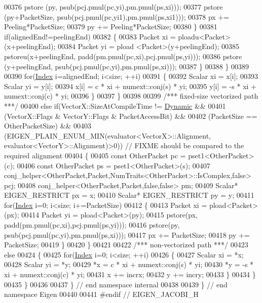 \begin{DoxyCode}
00376         pstore (py, psub(pcj.pmul(pc,yi),pm.pmul(ps,xi)));
00377         pstore (py+PacketSize, psub(pcj.pmul(pc,yi1),pm.pmul(ps,xi1)));
00378         px += Peeling*PacketSize;
00379         py += Peeling*PacketSize;
00380       \}
00381       \textcolor{keywordflow}{if}(alignedEnd!=peelingEnd)
00382       \{
00383         Packet xi = ploadu<Packet>(x+peelingEnd);
00384         Packet yi = pload <Packet>(y+peelingEnd);
00385         pstoreu(x+peelingEnd, padd(pm.pmul(pc,xi),pcj.pmul(ps,yi)));
00386         pstore (y+peelingEnd, psub(pcj.pmul(pc,yi),pm.pmul(ps,xi)));
00387       \}
00388     \}
00389 
00390     \textcolor{keywordflow}{for}(\hyperlink{namespace_eigen_a62e77e0933482dafde8fe197d9a2cfde}{Index} i=alignedEnd; i<size; ++i)
00391     \{
00392       Scalar xi = x[i];
00393       Scalar yi = y[i];
00394       x[i] =  c * xi + numext::conj(s) * yi;
00395       y[i] = -s * xi + numext::conj(c) * yi;
00396     \}
00397   \}
00398 
00399   \textcolor{comment}{/*** fixed-size vectorized path ***/}
00400   \textcolor{keywordflow}{else} \textcolor{keywordflow}{if}(VectorX::SizeAtCompileTime != \hyperlink{namespace_eigen_ad81fa7195215a0ce30017dfac309f0b2}{Dynamic} &&
00401           (VectorX::Flags & VectorY::Flags & PacketAccessBit) &&
00402           (PacketSize == OtherPacketSize) &&
00403           (EIGEN\_PLAIN\_ENUM\_MIN(evaluator<VectorX>::Alignment, evaluator<VectorY>::Alignment)>0)) \textcolor{comment}{// FIXME
       should be compared to the required alignment}
00404   \{
00405     \textcolor{keyword}{const} OtherPacket pc = pset1<OtherPacket>(c);
00406     \textcolor{keyword}{const} OtherPacket ps = pset1<OtherPacket>(s);
00407     conj\_helper<OtherPacket,Packet,NumTraits<OtherPacket>::IsComplex,\textcolor{keyword}{false}> pcj;
00408     conj\_helper<OtherPacket,Packet,false,false> pm;
00409     Scalar* EIGEN\_RESTRICT px = x;
00410     Scalar* EIGEN\_RESTRICT py = y;
00411     \textcolor{keywordflow}{for}(\hyperlink{namespace_eigen_a62e77e0933482dafde8fe197d9a2cfde}{Index} i=0; i<size; i+=PacketSize)
00412     \{
00413       Packet xi = pload<Packet>(px);
00414       Packet yi = pload<Packet>(py);
00415       pstore(px, padd(pm.pmul(pc,xi),pcj.pmul(ps,yi)));
00416       pstore(py, psub(pcj.pmul(pc,yi),pm.pmul(ps,xi)));
00417       px += PacketSize;
00418       py += PacketSize;
00419     \}
00420   \}
00421 
00422   \textcolor{comment}{/*** non-vectorized path ***/}
00423   \textcolor{keywordflow}{else}
00424   \{
00425     \textcolor{keywordflow}{for}(\hyperlink{namespace_eigen_a62e77e0933482dafde8fe197d9a2cfde}{Index} i=0; i<size; ++i)
00426     \{
00427       Scalar xi = *x;
00428       Scalar yi = *y;
00429       *x =  c * xi + numext::conj(s) * yi;
00430       *y = -s * xi + numext::conj(c) * yi;
00431       x += incrx;
00432       y += incry;
00433     \}
00434   \}
00435 \}
00436 
00437 \} \textcolor{comment}{// end namespace internal}
00438 
00439 \} \textcolor{comment}{// end namespace Eigen}
00440 
00441 \textcolor{preprocessor}{#endif // EIGEN\_JACOBI\_H}
\end{DoxyCode}
